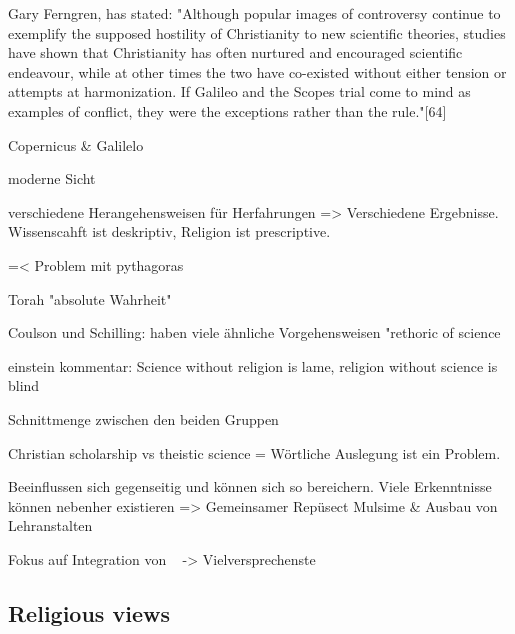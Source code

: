 Gary Ferngren, has stated: "Although popular images of controversy continue to exemplify the supposed hostility of Christianity to new scientific theories, studies have shown that Christianity has often nurtured and encouraged scientific endeavour, while at other times the two have co-existed without either tension or attempts at harmonization. If Galileo and the Scopes trial come to mind as examples of conflict, they were the exceptions rather than the rule."[64]


Copernicus \& Galilelo


moderne Sicht

verschiedene Herangehensweisen für Herfahrungen => Verschiedene Ergebnisse.
Wissenscahft ist deskriptiv, Religion ist prescriptive.

=< Problem mit pythagoras

Torah "absolute Wahrheit"




Coulson und Schilling: haben viele ähnliche Vorgehensweisen
"rethoric of science

einstein kommentar: Science without religion is lame, religion without science is blind


Schnittmenge zwischen den beiden Gruppen

Christian scholarship vs theistic science = Wörtliche Auslegung ist ein Problem.







Beeinflussen sich gegenseitig und können sich so bereichern. Viele Erkenntnisse können nebenher existieren => Gemeinsamer Repüsect
Mulsime \& Ausbau von Lehranstalten


Fokus auf Integration von \citeauthor{Barbour2002}~\cite{Barbour2002} -> Vielversprechenste



\subsection{Religious views}